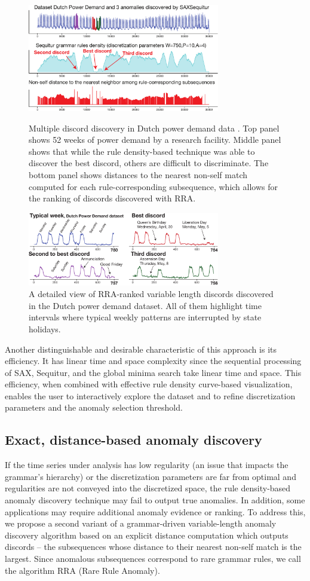 \documentclass{sig-alternate}
\begin{document}
\begin{figure}[t]
 \centering
 \includegraphics[width=84mm]{DutchPD_new.pdf}
 \caption{Multiple discord discovery in Dutch power demand data \cite{dutchpd}. Top panel shows 52 weeks of power demand by a research facility. Middle panel shows that while the rule density-based technique was able to discover the best discord, others are difficult to discriminate. The bottom panel shows distances to the nearest non-self match computed for each rule-corresponding subsequence, which allows for the ranking of discords discovered with RRA.}
 \vspace{2em}
 \label{fig:dutch_PD}
 \includegraphics[width=84mm]{DutchPD_new1.pdf}
 \caption{A detailed view of RRA-ranked variable length discords discovered in the Dutch power demand dataset. All of them highlight time intervals where typical weekly patterns are interrupted by state holidays.}
 \label{fig:dutch_PD2}
\end{figure}

Another distinguishable and desirable characteristic of this approach is its efficiency. It has linear time and space complexity since the sequential processing of SAX, Sequitur, and the global minima search take linear time and space. This efficiency, when combined with effective rule density curve-based visualization, enables the user to interactively explore the dataset and to refine discretization parameters and the anomaly selection threshold.

\subsection{Exact, distance-based anomaly discovery}
If the time series under analysis has low regularity (an issue that impacts the grammar's hierarchy) or the discretization parameters are far from optimal and regularities are not conveyed into the discretized space, the rule density-based anomaly discovery technique may fail to output true anomalies. In addition, some applications may require additional anomaly evidence or  ranking. To address this, we propose a second variant of a grammar-driven variable-length anomaly discovery algorithm based on an explicit distance computation which outputs discords -- the subsequences whose distance to their nearest non-self match is the largest. Since anomalous subsequences correspond to rare grammar rules, we call the algorithm RRA (Rare Rule Anomaly).
\end{document}
